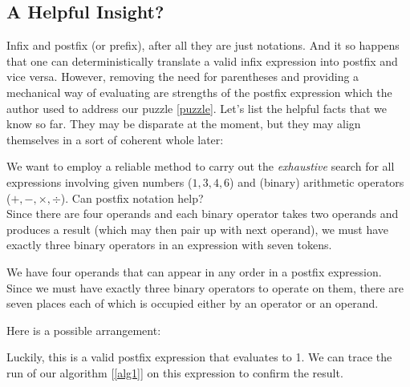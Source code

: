 \documentclass[english,smartquotes]{hgbarticle}
\newenvironment{arrangement}{\captionsetup{type=mytype}}{}
\begin{document}
\subsection{A Helpful Insight?}
Infix and postfix (or prefix), after all they are just notations. And it so happens that one can deterministically translate a valid infix expression into postfix and vice versa. 
However, removing the need for parentheses and providing a mechanical way of evaluating are strengths of the postfix expression which the author used to address our puzzle \ref{puzzle}. Let's list the helpful facts that we know so far. They may be disparate at the moment, but they may align themselves in a sort of coherent whole later:
\begin{tcolorbox}
[
colback=yellow!20,
colframe=cyan,
sharp corners,
boxrule=0.5pt,
]
We want to employ a reliable method to carry out the \emph{exhaustive} search for all expressions involving given numbers ($1, 3, 4, 6$) and (binary) arithmetic operators ($+, -, \times, \div$). Can postfix notation help? \\

Since there are four operands and each binary operator takes two operands and produces a result (which may then pair up with next operand), we must have exactly three binary operators in an expression with seven tokens.
\end{tcolorbox}

We have four operands that can appear in any order in a postfix expression. Since we must have exactly three binary operators to operate on them, there are seven places each of which is occupied either by an operator or an operand. 

Here is a possible arrangement:

\begin{arrangement}
\vspace{2mm}
\centering
{}
\label{goodperm1}
\end{arrangement}

Luckily, this is a valid postfix expression that evaluates to 1. We can trace the run of our algorithm [\ref{alg1}] on this expression to confirm the result.
\end{document}

